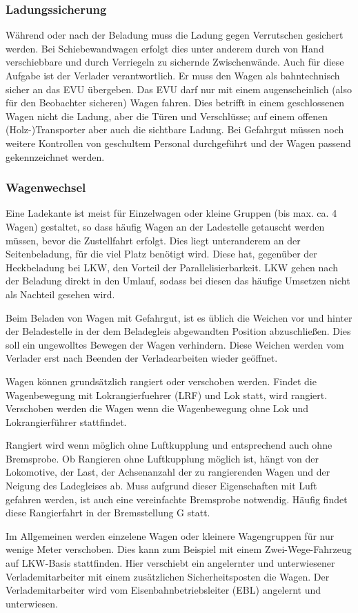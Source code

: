 \subsubsection{Ladungssicherung}
Während oder nach der Beladung muss die Ladung gegen Verrutschen gesichert werden. Bei Schiebewandwagen erfolgt dies unter anderem durch von Hand verschiebbare und durch Verriegeln zu sichernde Zwischenwände. Auch für diese Aufgabe ist der Verlader verantwortlich. Er muss den Wagen als bahntechnisch sicher an das EVU übergeben. Das EVU darf nur mit einem augenscheinlich (also für den Beobachter sicheren) Wagen fahren. Dies betrifft in einem geschlossenen Wagen nicht die Ladung, aber die Türen und Verschlüsse; auf einem offenen (Holz-)Transporter aber auch die sichtbare Ladung. Bei Gefahrgut müssen noch weitere Kontrollen von geschultem Personal durchgeführt und der Wagen passend gekennzeichnet werden.
\subsubsection{Wagenwechsel}
Eine Ladekante ist meist für Einzelwagen oder kleine Gruppen (bis max. ca. 4 Wagen) gestaltet, so dass häufig Wagen an der Ladestelle getauscht werden müssen, bevor die Zustellfahrt erfolgt. Dies liegt unteranderem an der Seitenbeladung, für die viel Platz benötigt wird. Diese hat, gegenüber der Heckbeladung bei LKW, den Vorteil der Parallelisierbarkeit. LKW gehen nach der Beladung direkt in den Umlauf, sodass bei diesen das häufige Umsetzen nicht als Nachteil gesehen wird. \par
Beim Beladen von Wagen mit Gefahrgut, ist es üblich die Weichen vor und hinter der Beladestelle in der dem Beladegleis abgewandten Position abzuschließen. Dies soll ein ungewolltes Bewegen der Wagen verhindern. Diese Weichen werden vom Verlader erst nach Beenden der Verladearbeiten wieder geöffnet.\par
Wagen können grundsätzlich rangiert oder verschoben werden. Findet die Wagenbewegung mit \gls{Lokrangierfuehrer} (\acrshort{LRF}) und Lok statt, wird rangiert. Verschoben werden die Wagen wenn die Wagenbewegung ohne Lok und Lokrangierführer stattfindet.\par
Rangiert wird wenn möglich ohne Luftkupplung und entsprechend auch ohne \gls{Bremsprobe}. Ob Rangieren ohne Luftkupplung möglich ist, hängt von der Lokomotive, der Last, der Achsenanzahl der zu rangierenden Wagen und der Neigung des Ladegleises ab. Muss aufgrund dieser Eigenschaften mit Luft gefahren werden, ist auch eine vereinfachte \gls{Bremsprobe} notwendig. Häufig findet diese Rangierfahrt in der Bremsstellung G statt.\par
Im Allgemeinen werden einzelene Wagen oder kleinere Wagengruppen für nur wenige Meter verschoben. Dies kann zum Beispiel mit einem Zwei-Wege-Fahrzeug auf LKW-Basis stattfinden. Hier verschiebt ein angelernter und unterwiesener Verlademitarbeiter mit einem zusätzlichen Sicherheitsposten die Wagen. Der Verlademitarbeiter wird vom \gls{Eisenbahnbetriebsleiter} (\acrshort{EBL}) angelernt und unterwiesen.
